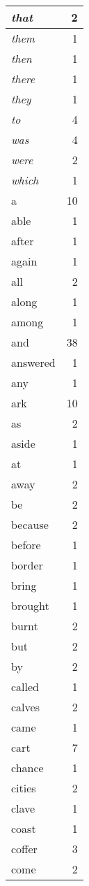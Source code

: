 \begin{center}
\begin{longtable}{l|r}
\emph{that} & 2 \\ \hline
\emph{them} & 1 \\ \hline
\emph{then} & 1 \\ \hline
\emph{there} & 1 \\ \hline
\emph{they} & 1 \\ \hline
\emph{to} & 4 \\ \hline
\emph{was} & 4 \\ \hline
\emph{were} & 2 \\ \hline
\emph{which} & 1 \\ \hline
a & 10 \\ \hline
able & 1 \\ \hline
after & 1 \\ \hline
again & 1 \\ \hline
all & 2 \\ \hline
along & 1 \\ \hline
among & 1 \\ \hline
and & 38 \\ \hline
answered & 1 \\ \hline
any & 1 \\ \hline
ark & 10 \\ \hline
as & 2 \\ \hline
aside & 1 \\ \hline
at & 1 \\ \hline
away & 2 \\ \hline
be & 2 \\ \hline
because & 2 \\ \hline
before & 1 \\ \hline
border & 1 \\ \hline
bring & 1 \\ \hline
brought & 1 \\ \hline
burnt & 2 \\ \hline
but & 2 \\ \hline
by & 2 \\ \hline
called & 1 \\ \hline
calves & 2 \\ \hline
came & 1 \\ \hline
cart & 7 \\ \hline
chance & 1 \\ \hline
cities & 2 \\ \hline
clave & 1 \\ \hline
coast & 1 \\ \hline
coffer & 3 \\ \hline
come & 2 \\ \hline

\end{longtable}
\end{center}
